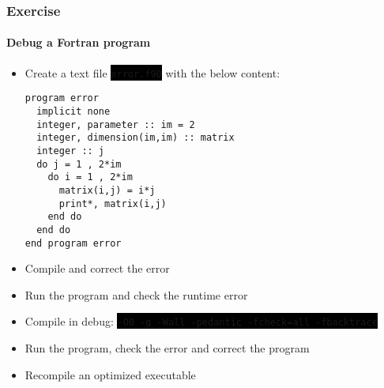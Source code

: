 \documentclass[unknownkeysallowed, 10pt, a4 paper, handout]{beamer}
\newcommand{\code}[1]{\colorbox{black}{\color{green}\texttt{#1}}}
\begin{document}
\begin{frame}[label=exercise2, fragile=singleslide]
  \frametitle{Exercise}
  \framesubtitle{Debug a Fortran program}
  \begin{itemize}
    \item Create a text file \code{error.f90} with the below content:
      \footnotesize{
      \begin{verbatim}
program error
  implicit none
  integer, parameter :: im = 2
  integer, dimension(im,im) :: matrix
  integer :: j
  do j = 1 , 2*im
    do i = 1 , 2*im
      matrix(i,j) = i*j
      print*, matrix(i,j)
    end do
  end do
end program error
      \end{verbatim}
      }
    \item Compile and correct the error
    \item Run the program and check the runtime error
    \item Compile in debug:
        \code{-O0 -g -Wall -pedantic -fcheck=all -fbacktrace}
    \item Run the program, check the error and correct the program
    \item Recompile an optimized executable
  \end{itemize}
\end{frame}
\end{document}
